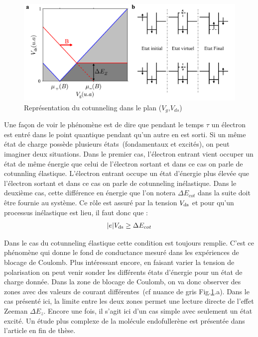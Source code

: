 \begin{figure}
\includegraphics[scale=0.5]{Theorie/Transport/figure5/figure5.pdf} 
\caption{Représentation du cotunneling dans le plan ($V_g$,$V_{ds}$)}
\label{charge_discharge}
\end{figure}


Une façon de voir le phénomène est de dire que pendant le temps $\tau$ un électron est entré dans le point quantique pendant qu'un autre en est sorti. Si un m\^eme état de charge possède plusieurs états~(fondamentaux et excités), on peut imaginer deux situations. Dans le premier cas, l'électron entrant vient occuper un état de m\^eme énergie que celui de l'électron sortant et dans ce cas on parle de cotunnling élastique. L'électron entrant occupe un état d'énergie plus élevée que l'électron sortant et dans ce cas on parle de cotunneling inélastique. Dans le deuxième cas, cette différence en énergie que l'on notera $\Delta E_{cot}$ dans la suite doit être fournie au système. Ce rôle est assuré par la tension $V_{\rm{ds}}$ et pour qu'un processus inélastique est lieu, il faut donc que :
\begin{eqnarray}
|e|V_{\rm{ds}} \geq \Delta E_{cot}
\end{eqnarray}

Dans le cas du cotunneling élastique cette condition est toujours remplie. C'est ce phénomène qui donne le fond de conductance mesuré dans les expériences de blocage de Coulomb. Plus intéressant encore, en faisant varier la tension de polarisation on peut venir sonder les différents états d'énergie pour un état de charge donnée.  Dans la zone de blocage de Coulomb, on va donc observer des zones avec des valeurs de courant différentes~(cf nuance de gris Fig.\ref{charge_discharge}.a). Dans le cas présenté ici, la limite entre les deux zones permet une lecture directe de l'effet Zeeman $\Delta E_z$. Encore une fois, il s'agit ici d'un cas simple avec seulement un état excité. Un étude plus complexe de la molécule endofullerène est présentée dans l'article en fin de thèse.\newline

